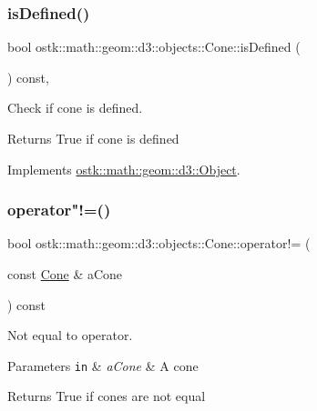 \subsubsection{\texorpdfstring{is\+Defined()}{isDefined()}}
{\footnotesize\ttfamily bool ostk\+::math\+::geom\+::d3\+::objects\+::\+Cone\+::is\+Defined (\begin{DoxyParamCaption}{ }\end{DoxyParamCaption}) const\hspace{0.3cm}{\ttfamily [override]}, {\ttfamily [virtual]}}



Check if cone is defined. 

\begin{DoxyReturn}{Returns}
True if cone is defined 
\end{DoxyReturn}


Implements \hyperlink{classostk_1_1math_1_1geom_1_1d3_1_1_object_a271a1964cd208be85ce9a0a429395ad8}{ostk\+::math\+::geom\+::d3\+::\+Object}.

\mbox{\label{classostk_1_1math_1_1geom_1_1d3_1_1objects_1_1_cone_abdc26e7cac7c112933e7aab3acc1fc55}} 
\subsubsection{\texorpdfstring{operator"!=()}{operator!=()}}
{\footnotesize\ttfamily bool ostk\+::math\+::geom\+::d3\+::objects\+::\+Cone\+::operator!= (\begin{DoxyParamCaption}\item[{const \hyperlink{classostk_1_1math_1_1geom_1_1d3_1_1objects_1_1_cone}{Cone} \&}]{a\+Cone }\end{DoxyParamCaption}) const}



Not equal to operator. 


\begin{DoxyParams}[1]{Parameters}
\mbox{\tt in}  & {\em a\+Cone} & A cone \\
\hline
\end{DoxyParams}
\begin{DoxyReturn}{Returns}
True if cones are not equal 
\end{DoxyReturn}
\mbox{\label{classostk_1_1math_1_1geom_1_1d3_1_1objects_1_1_cone_a705e91fbd024f12e214030fd3a4ad8a0}} 
